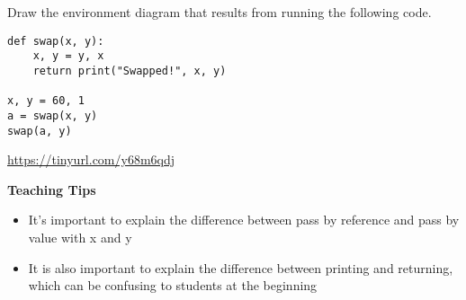 \question Draw the environment diagram that results from running the following code.

\begin{lstlisting}
def swap(x, y):
    x, y = y, x
    return print("Swapped!", x, y)

x, y = 60, 1
a = swap(x, y)
swap(a, y)
\end{lstlisting}


\begin{solution}[2in]
\url{https://tinyurl.com/y68m6qdj}
\end{solution}

\begin{guide}
\begin{blocksection}
\textbf{Teaching Tips}
  \begin{itemize}
    \item It's important to explain the difference between pass by reference and pass by value with x and y
    \item It is also important to explain the difference between printing and returning, which can be confusing to students at the beginning
  \end{itemize}
\end{blocksection}
\end{guide}
